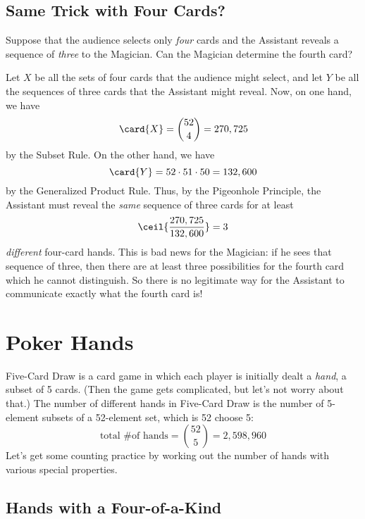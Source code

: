 \subsection{Same Trick with Four Cards?}\label{4_card_trick_subsec}

Suppose that the audience selects only \emph{four} cards and the
Assistant reveals a sequence of \emph{three} to the Magician.  Can
the Magician determine the fourth card?

Let $X$ be all the sets of four cards that the audience might select,
and let $Y$ be all the sequences of three cards that the Assistant
might reveal.  Now, on one hand, we have
\[
\card{X} = \binom{52}{4} = 270,725
\]
by the Subset Rule.  On the other hand, we have
\[
\card{Y} = 52 \cdot 51 \cdot 50 = 132,600
\]
by the Generalized Product Rule.  Thus, by the Pigeonhole Principle, the
Assistant must reveal the \emph{same} sequence of three cards for at
least
\[
\ceil{\frac{270,725}{132,600}} = 3
\]
\emph{different} four-card hands.  This is bad news for the Magician:
if he sees that sequence of three, then there are at least three
possibilities for the fourth card which he cannot distinguish.  So there
is no legitimate way for the Assistant to communicate exactly what the
fourth card is!


\begin{problems}
\classproblems
{}

\homeworkproblems


\end{problems}


\section{Poker Hands}\label{poker hands}

Five-Card Draw is a card game in which each player is initially dealt
a \emph{hand}, a subset of 5 cards.  (Then the game gets
complicated, but let's not worry about that.)  The number of different
hands in Five-Card Draw is the number of 5-element subsets of a
52-element set, which is 52 choose 5:
%
\[
\text{total \# of hands} = \binom{52}{5} = 2,598,960
\]
%
Let's get some counting practice by working out the number of hands
with various special properties.

\subsection{Hands with a Four-of-a-Kind}


